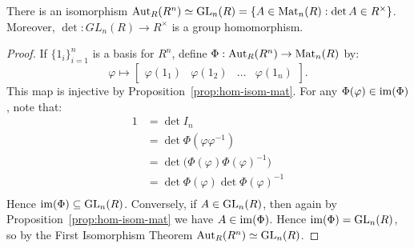 \begin{proposition}
	There is an isomorphism $\operatorname{Aut}_R(R^n) \simeq \operatorname{GL}_n(R) = \{A \in \operatorname{Mat}_n(R) : \det A \in R^\times\}$. Moreover, $\det : GL_n(R) \rightarrow R^\times$ is a group homomorphism.
\end{proposition}
	\begin{proof}
		If $\{1_i\}_{i=1}^n$ is a basis for $R^n$, define $\Phi: \operatorname{Aut}_R(R^n) \rightarrow \operatorname{Mat}_n(R)$ by:
		\[
			\varphi \mapsto \begin{bmatrix} \varphi(1_1) & \varphi(1_2) & \ldots & \varphi(1_n) \end{bmatrix}.
		\]
		This map is injective by Proposition~\ref{prop:hom-isom-mat}. For any $\Phi(\varphi) \in \operatorname{im}(\Phi)$, note that:
		\begin{align*}
			1
			&= \det I_n \\
			&= \det \Phi(\varphi \varphi^{-1}) \\
			&= \det \bigl(\Phi(\varphi) \Phi(\varphi)^{-1}\bigr) \\
			&= \det \Phi(\varphi) \det \Phi(\varphi)^{-1} \\
		\end{align*}
		Hence $\operatorname{im}(\Phi) \subseteq \operatorname{GL}_n(R)$. Conversely, if $A \in \operatorname{GL}_n(R)$, then again by Proposition~\ref{prop:hom-isom-mat} we have $A \in \operatorname{im}(\Phi)$. Hence $\operatorname{im}(\Phi) = \operatorname{GL}_n(R)$, so by the First Isomorphism Theorem $\operatorname{Aut}_R(R^n) \simeq \operatorname{GL}_n(R)$.
	\end{proof}

